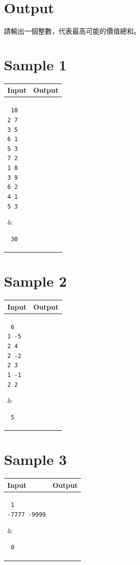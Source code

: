 \documentclass[11pt,a4paper]{article}
\begin{document}
\section*{Output}

請輸出一個整數，代表最高可能的價值總和。

\section*{Sample 1}
\begin{longtable}[!h]{|p{}|p{}|}
\hline
\textbf {Input}	& \textbf {Output} \\
\hline
\parbox[t]{0.5\textwidth} %
{ \tt
10 \\
2 7 \\
3 5 \\
6 1 \\
5 3 \\
7 2 \\
1 8 \\
3 9 \\
6 2 \\
4 1 \\
5 3 \\
} &
\parbox[t]{0.5\textwidth}
{ \tt
30 \\
} \\
\hline
\end{longtable}

\section*{Sample 2}
\begin{longtable}[!h]{|p{}|p{}|}
\hline
\textbf {Input}	& \textbf {Output} \\
\hline
\parbox[t]{0.5\textwidth} %
{ \tt
6 \\
1 -5 \\
2 4 \\
2 -2 \\
2 3 \\
1 -1 \\
2 2 \\
} &
\parbox[t]{0.5\textwidth}
{ \tt
5 \\
} \\
\hline
\end{longtable}

\section*{Sample 3}
\begin{longtable}[!h]{|p{}|p{}|}
\hline
\textbf {Input}	& \textbf {Output} \\
\hline
\parbox[t]{0.5\textwidth} %
{ \tt
1 \\
-7777 -9999 \\
} &
\parbox[t]{0.5\textwidth}
{ \tt
0 \\
} \\
\hline
\end{longtable}
\end{document}
